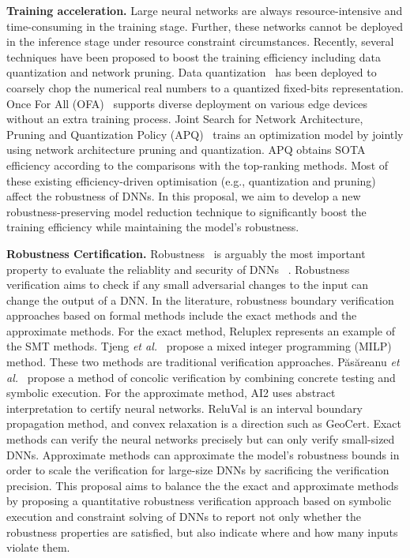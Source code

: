 {\textbf{Training acceleration.}}
Large neural networks are always resource-intensive and time-consuming in the training stage. Further, these networks cannot be deployed in the inference stage under resource constraint circumstances. Recently, several techniques have been proposed to boost the training efficiency including data quantization and network pruning. 
Data quantization~\cite{wang2020apq} has been deployed to coarsely chop the numerical real numbers to a quantized fixed-bits representation. 
Once For All (OFA)~\cite{cai2020once} supports diverse deployment on various edge devices without an extra training process. 
Joint Search for Network Architecture, Pruning and Quantization Policy (APQ)~\cite{wang2020apq} trains an optimization model by jointly using network architecture pruning and quantization. APQ obtains SOTA efficiency according to the comparisons with the top-ranking methods.
Most of these existing efficiency-driven optimisation (e.g., quantization and pruning) affect the robustness of DNNs. 
In this proposal, we aim to develop a new robustness-preserving model reduction technique to significantly boost the training efficiency while maintaining the model's robustness.

{\textbf{Robustness Certification.}} Robustness~\cite{carlini2017towards} is arguably the most important property to evaluate the reliablity and security of DNNs  ~\cite{NIPS2018shiqi}.
Robustness verification aims to check if any small adversarial  changes to the input can change the output of a DNN. 
In the literature, robustness boundary verification approaches based on formal methods include the exact methods and the approximate methods. 
For the exact method, Reluplex\cite{katz2017reluplex} represents an example of the SMT methods. Tjeng \textit{et al.}~\cite{tjeng2017evaluating} propose a mixed integer programming (MILP) method. These two methods are traditional verification approaches. P{\u{a}}s{\u{a}}reanu \textit{et al.}~\cite{puasuareanu2020probabilistic} propose a method of concolic verification by combining  concrete testing and symbolic execution.
For the approximate method, AI2 \cite{AI2} uses abstract interpretation to certify neural networks. ReluVal\cite{ReluVal} is an interval boundary propagation method, and convex relaxation is a direction such as GeoCert\cite{NEURIPS2019_GeoCert}. 
Exact methods can verify the neural networks precisely but can only verify small-sized DNNs. Approximate methods can approximate the model’s robustness bounds in order to scale the verification for large-size DNNs by sacrificing the verification precision. 
This proposal aims to balance the the exact and approximate methods by proposing a quantitative robustness verification approach based on symbolic execution and constraint solving of DNNs to report not only whether the robustness properties are satisfied, but also indicate where and how many inputs violate them.

